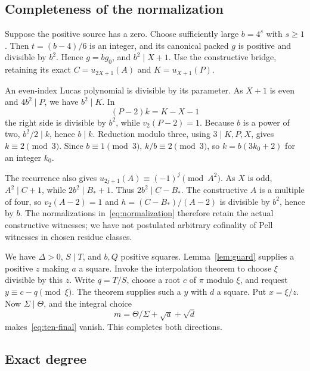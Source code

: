 \documentclass[11pt,a4paper]{article}
\theoremstyle{definition}\newtheorem{definition}[theorem]{Definition}
\theoremstyle{remark}\newtheorem{remark}[theorem]{Remark}
\begin{document}
\subsection{Completeness of the normalization}

Suppose the positive source has a zero. Choose sufficiently large
$b=4^s$ with $s\ge1$. Then $t=(b-4)/6$ is an integer, and its canonical
packed $g$ is positive and divisible by $b^2$. Hence $g=bg_0$, and
$b^2\mid X+1$. Use the constructive bridge, retaining its exact
$C=u_{2X+1}(A)$ and $K=u_{X+1}(P)$.

An even-index Lucas polynomial is divisible by its parameter. As $X+1$
is even and $4b^2\mid P$, we have $b^2\mid K$. In
\[
 (P-2)k=K-X-1
\]
the right side is divisible by $b^2$, while $v_2(P-2)=1$. Because $b$ is
a power of two, $b^2/2\mid k$, hence $b\mid k$. Reduction modulo three,
using $3\mid K,P,X$, gives $k\equiv2\pmod3$. Since $b\equiv1\pmod3$,
$k/b\equiv2\pmod3$, so $k=b(3k_0+2)$ for an integer $k_0$.

The recurrence also gives
$u_{2j+1}(A)\equiv(-1)^j\pmod{A^2}$. As $X$ is odd,
$A^2\mid C+1$, while $2b^2\mid B_*+1$. Thus $2b^2\mid C-B_*$.
The constructive $A$ is a multiple of four, so $v_2(A-2)=1$ and
$h=(C-B_*)/(A-2)$ is divisible by $b^2$, hence by $b$.
The normalizations in~\eqref{eq:normalization} therefore retain the
actual constructive witnesses; we have not postulated arbitrary
cofinality of Pell witnesses in chosen residue classes.

We have $\Delta>0$, $S\mid T$, and $b,Q$ positive squares.
Lemma~\ref{lem:guard} supplies a positive $z$ making $a$ a square.
Invoke the interpolation theorem to choose $\xi$ divisible by this $z$.
Write $q=T/S$, choose a root $c$ of $\pi$ modulo $\xi$, and request
$y\equiv c-q\pmod\xi$. The theorem supplies such a $y$ with $d$ a
square. Put $x=\xi/z$. Now $\Sigma\mid\Theta$, and the integral choice
\[
 m=\Theta/\Sigma+\sqrt a+\sqrt d
\]
makes~\eqref{eq:ten-final} vanish. This completes both directions.

\subsection{Exact degree}
\end{document}
